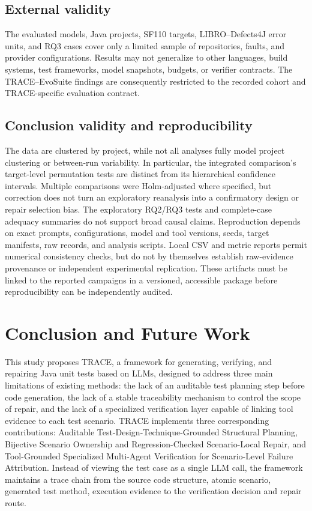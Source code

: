 \documentclass[pdflatex,sn-basic,Numbered,iicol]{sn-jnl}
\begin{document}
\subsection{External validity}

The evaluated models, Java projects, SF110 targets, LIBRO--Defects4J error units, and RQ3 cases cover only a limited sample of repositories, faults, and provider configurations. Results may not generalize to other languages, build systems, test frameworks, model snapshots, budgets, or verifier contracts. The TRACE--EvoSuite findings are consequently restricted to the recorded cohort and TRACE-specific evaluation contract.

\subsection{Conclusion validity and reproducibility}

The data are clustered by project, while not all analyses fully model project clustering or between-run variability. In particular, the integrated comparison's target-level permutation tests are distinct from its hierarchical confidence intervals. Multiple comparisons were Holm-adjusted where specified, but correction does not turn an exploratory reanalysis into a confirmatory design or repair selection bias. The exploratory RQ2/RQ3 tests and complete-case adequacy summaries do not support broad causal claims. Reproduction depends on exact prompts, configurations, model and tool versions, seeds, target manifests, raw records, and analysis scripts. Local CSV and metric reports permit numerical consistency checks, but do not by themselves establish raw-evidence provenance or independent experimental replication. These artifacts must be linked to the reported campaigns in a versioned, accessible package before reproducibility can be independently audited.

\section{Conclusion and Future Work}\label{sec:conclusion}

This study proposes TRACE, a framework for generating, verifying, and repairing Java unit tests based on LLMs, designed to address three main limitations of existing methods: the lack of an auditable test planning step before code generation, the lack of a stable traceability mechanism to control the scope of repair, and the lack of a specialized verification layer capable of linking tool evidence to each test scenario. TRACE implements three corresponding contributions: Auditable Test-Design-Technique-Grounded Structural Planning, Bijective Scenario Ownership and Regression-Checked Scenario-Local Repair, and Tool-Grounded Specialized Multi-Agent Verification for Scenario-Level Failure Attribution. Instead of viewing the test case as a single LLM call, the framework maintains a trace chain from the source code structure, atomic scenario, generated test method, execution evidence to the verification decision and repair route.
\end{document}
